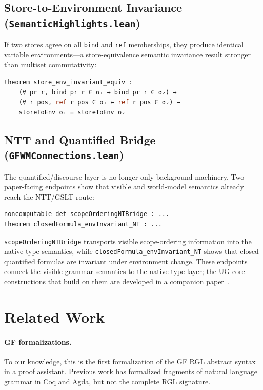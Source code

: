 \documentclass[11pt]{article}
\newcommand{\code}[1]{\texttt{#1}}
\newcommand{\GF}{\textup{GF}}
\newcommand{\RGL}{\textup{RGL}}
\newcommand{\NTT}{\textup{NTT}}
\begin{document}
\subsection{Store-to-Environment Invariance (\code{SemanticHighlights.lean})}

If two stores agree on all \code{bind} and \code{ref} memberships, they
produce identical variable environments---a store-equivalence semantic
invariance result stronger than multiset commutativity:
\begin{lstlisting}[language=ml]
theorem store_env_invariant_equiv :
    (∀ pr r, bind pr r ∈ σ₁ ↔ bind pr r ∈ σ₂) →
    (∀ r pos, ref r pos ∈ σ₁ ↔ ref r pos ∈ σ₂) →
    storeToEnv σ₁ = storeToEnv σ₂
\end{lstlisting}

\subsection{NTT and Quantified Bridge (\code{GFWMConnections.lean})}

The quantified/discourse layer is no longer only background machinery.  Two
paper-facing endpoints show that visible and world-model semantics already reach
the \NTT{}/GSLT route:
\begin{lstlisting}[language=ml]
noncomputable def scopeOrderingNTBridge : ...
theorem closedFormula_envInvariant_NT : ...
\end{lstlisting}
\code{scopeOrderingNTBridge} transports visible scope-ordering information into
the native-type semantics, while
\code{closedFormula\_envInvariant\_NT} shows that closed quantified formulas are
invariant under environment change.  These endpoints connect the visible grammar semantics to the
native-type layer; the UG-core constructions that build on them
are developed in a companion paper~\cite{UGCores2026}.

\section{Related Work}
\label{sec:related}

\paragraph{GF formalizations.}  To our knowledge, this is the first
formalization of the \GF{} \RGL{} abstract syntax in a proof assistant.
Previous work has formalized fragments of natural language grammar in
Coq and Agda, but not the complete \RGL{} signature.
\end{document}

